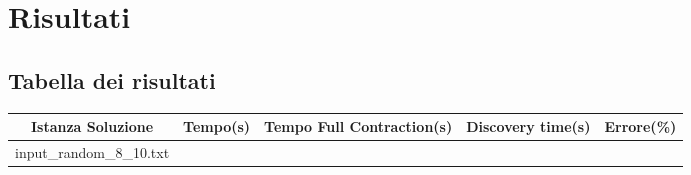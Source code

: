 \section{Risultati}\label{risultati}

\subsection{Tabella dei risultati}
\begin{center}
	\begin{tabularx}{\linewidth}{|c|c|c|c|c|}
		\hline
		{Istanza Soluzione} & {Tempo(s)} & \parbox{3cm}{\vspace{.1cm}\centering Tempo Full Contraction(s)\vspace{.1cm}} & {Discovery time(s)} & {Errore(\%)}\\\hline
		input\_random\_8\_10.txt&&&&
	\end{tabularx}
\end{center}

